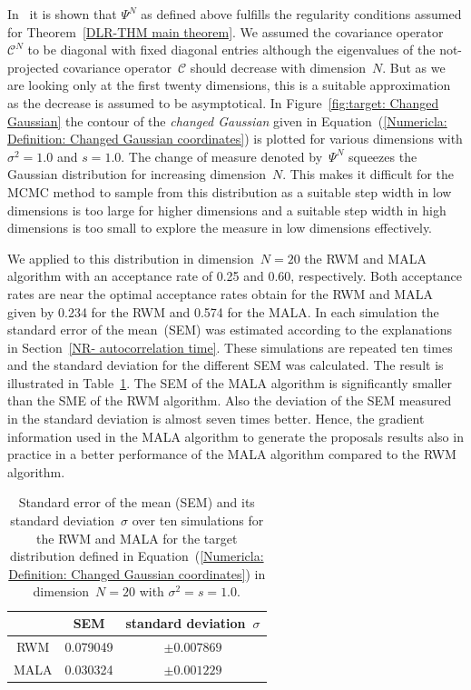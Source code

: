 In~\autocite[Remark 2.3]{Pillai2012} it is shown that $\Psi^N$ as defined above fulfills the regularity conditions assumed for Theorem~\ref{DLR-THM main theorem}. We assumed the covariance operator~$\mathcal{C}^N$ to be diagonal with fixed diagonal entries although the eigenvalues of the not-projected covariance operator~$\mathcal{C}$ should decrease with dimension~$N$. But as we are looking only at the first twenty dimensions, this is a suitable approximation as the decrease is assumed to be asymptotical. In Figure~\ref{fig:target: Changed Gaussian} the contour of the \textit{changed Gaussian} given in Equation~(\ref{Numericla: Definition: Changed Gaussian coordinates}) is plotted for various dimensions with $\sigma^2=1.0$ and $s=1.0$. The change of measure denoted by~$\Psi^N$ squeezes the Gaussian distribution for increasing dimension~$N$. This makes it difficult for the MCMC method to sample from this distribution as a suitable step width in low dimensions is too large for higher dimensions and a suitable step width in high dimensions is too small to explore the measure in low dimensions effectively.


We applied to this distribution in dimension~$N=20$ the RWM and MALA algorithm with an acceptance rate of 0.25 and 0.60, respectively. Both acceptance rates are near the optimal acceptance rates obtain for the RWM and MALA given by 0.234 for the RWM and 0.574 for the MALA. In each simulation the standard error of the mean~(SEM) was estimated according to the explanations in Section~\ref{NR- autocorrelation time}. These simulations are repeated ten times and the standard deviation for the different SEM was calculated. The result is illustrated in Table~\ref{Numerical: Tabular Comparison RWM and MALA}. The SEM of the MALA algorithm is significantly smaller than the SME of the RWM algorithm. Also the deviation of the SEM measured in the standard deviation is almost seven times better. Hence, the gradient information used in the MALA algorithm to generate the proposals results also in practice in a better performance of the MALA algorithm compared to the RWM algorithm.

\begin{table}%
\centering
 \begin{tabular}{ccc}
     &	SEM	&	standard deviation~$\sigma$ \\ 
  \hline 
 RWM & 0.079049 & $\pm 0.007869$ \\ [1mm]
 MALA & 0.030324 & $\pm 0.001229$ \\
\end{tabular}
 \caption{Standard error of the mean (SEM) and its standard deviation~$\sigma$ over ten simulations for the RWM and MALA for the target distribution defined in Equation~(\ref{Numericla: Definition: Changed Gaussian coordinates}) in dimension~$N=20$ with $\sigma^2=s=1.0$.}
 \label{Numerical: Tabular Comparison RWM and MALA}
\end{table}




